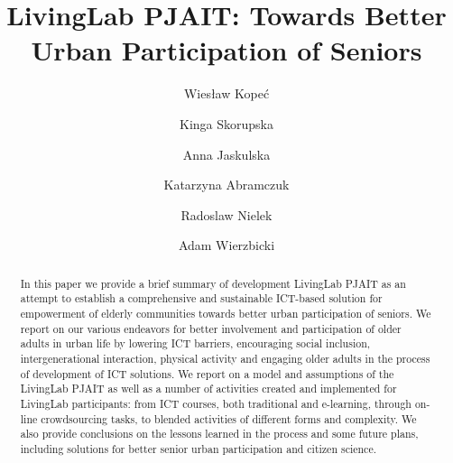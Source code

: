 \documentclass[sigconf]{acmart}
\begin{document}
\title{LivingLab PJAIT: Towards Better Urban Participation of Seniors}




\author{Wies\l{}aw Kope\'{c}}

\author{Kinga Skorupska}

\author{Anna Jaskulska}

\author{Katarzyna Abramczuk}


\author{Radoslaw Nielek}

\author{Adam Wierzbicki}

\renewcommand{\shortauthors}{W. Kopec et al.}

\begin{abstract}
In this paper we provide a brief summary of development LivingLab PJAIT as an attempt to establish a comprehensive and sustainable ICT-based solution for empowerment of elderly communities towards better urban participation of seniors. We report on our various endeavors for better involvement and participation of older adults in urban life by lowering ICT barriers, encouraging social inclusion, intergenerational interaction, physical activity and engaging older adults in the process of development of ICT solutions. We report on a model and assumptions of the LivingLab PJAIT as well as a number of activities created and implemented for LivingLab participants: from ICT courses, both traditional and e-learning, through on-line crowdsourcing tasks, to blended activities of different forms and complexity. We also provide conclusions on the lessons learned in the process and some future plans, including solutions for better senior urban participation and citizen science.


\end{abstract}
\end{document}
